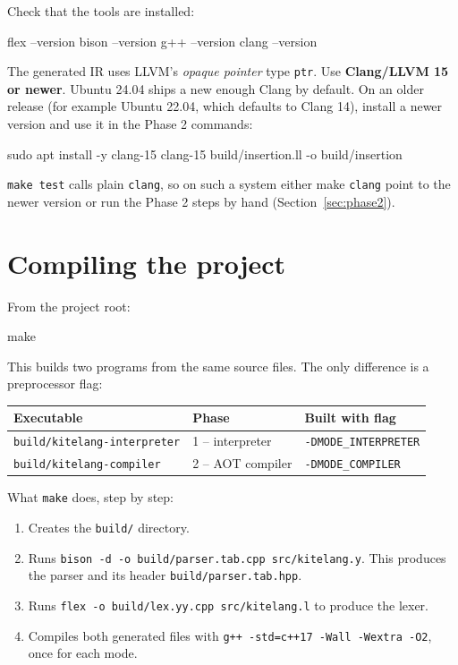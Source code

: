 \documentclass[11pt,a4paper]{article}
\newcommand{\fn}[1]{\texttt{#1}}
\begin{document}
Check that the tools are installed:

\begin{shell}
flex --version
bison --version
g++ --version
clang --version
\end{shell}

\begin{warnbox}
The generated IR uses LLVM's \emph{opaque pointer} type \fn{ptr}. Use \textbf{Clang/LLVM 15 or newer}. Ubuntu 24.04 ships a new enough Clang by default. On an older release (for example Ubuntu 22.04, which defaults to Clang 14), install a newer version and use it in the Phase 2 commands:
\begin{shell}
sudo apt install -y clang-15
clang-15 build/insertion.ll -o build/insertion
\end{shell}
\fn{make test} calls plain \fn{clang}, so on such a system either make \fn{clang} point to the newer version or run the Phase 2 steps by hand (Section~\ref{sec:phase2}).
\end{warnbox}

\section{Compiling the project}

From the project root:

\begin{shell}
make
\end{shell}

This builds two programs from the same source files. The only difference is a preprocessor flag:

\begin{center}
\begin{tabular}{l l l}
\toprule
\textbf{Executable} & \textbf{Phase} & \textbf{Built with flag}\\
\midrule
\fn{build/kitelang-interpreter} & 1 -- interpreter & \fn{-DMODE\_INTERPRETER}\\
\fn{build/kitelang-compiler}    & 2 -- AOT compiler & \fn{-DMODE\_COMPILER}\\
\bottomrule
\end{tabular}
\end{center}

What \fn{make} does, step by step:
\begin{enumerate}
\item Creates the \fn{build/} directory.
\item Runs \fn{bison -d -o build/parser.tab.cpp src/kitelang.y}. This produces the parser and its header \fn{build/parser.tab.hpp}.
\item Runs \fn{flex -o build/lex.yy.cpp src/kitelang.l} to produce the lexer.
\item Compiles both generated files with \fn{g++ -std=c++17 -Wall -Wextra -O2}, once for each mode.
\end{enumerate}
\end{document}
